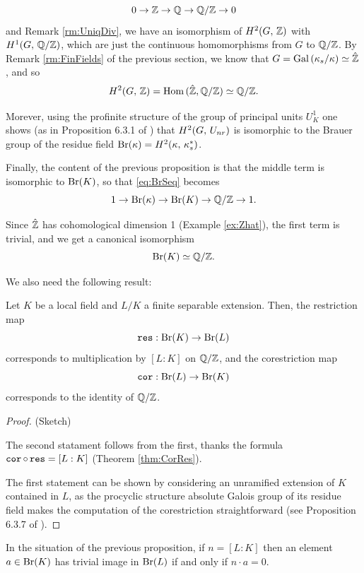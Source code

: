 \documentclass[a4paper, oneside]{memoir}
\begin{document}
\[
    0\to\mathbb{Z}\to\mathbb{Q}\to\mathbb{Q}/\mathbb{Z}\to 0
\]
and Remark \ref{rm:UniqDiv}, we have an isomorphism of $H^{2}( G, \, \mathbb{Z} )$ with $H^{1}( G, \, \mathbb{Q}/\mathbb{Z} )$, which are just the continuous homomorphisms from $G$ to $\mathbb{Q}/\mathbb{Z}$. By Remark
\ref{rm:FinFields} of the previous
section, we know that $G=\operatorname{Gal}{(\kappa_{s}/\kappa)}\simeq\hat{\mathbb{Z}}$, and so
\[
    H^{2}( G, \, \mathbb{Z} )=\operatorname{Hom}{(\hat{\mathbb{Z}},\mathbb{Q}/\mathbb{Z})}\simeq\mathbb{Q}/\mathbb{Z}.
\]

Morever, using the profinite structure of the group of principal units $U_K^1$ one shows (as in Proposition 6.3.1 of \cite{SzamuelyGille}) that $H^{2}( G, \, U_{nr} )$ is isomorphic to
the Brauer group of the residue field $\mathrm{Br}(\kappa)=H^{2}( \kappa, \, \kappa_{s}^* )$.

Finally, the content of the previous proposition is that the middle term is isomorphic to $\mathrm{Br}(K)$, so that \eqref{eq:BrSeq} becomes
\[
    1\to\mathrm{Br}(\kappa)\to\mathrm{Br}(K)\to\mathbb{Q}/\mathbb{Z}\to 1.
\]

Since $\hat{\mathbb{Z}}$ has cohomological dimension 1 (Example \ref{ex:Zhat}), the first term is trivial, and we get a canonical isomorphism
\begin{equation}\label{eq:BrK}
    \mathrm{Br}(K)\simeq\mathbb{Q}/\mathbb{Z}.
\end{equation}

We also need the following result:

\begin{proposition}\label{prop:BrCorRes}
    Let $K$ be a local field and $L/K$ a finite separable extension. Then, the restriction map
    \[
        \operatorname{\mathtt{res}}: \mathrm{Br}(K)\to\mathrm{Br}(L)
    \]
    corresponds to multiplication by $[L:K]$ on $\mathbb{Q}/\mathbb{Z}$,
    and the corestriction map
    \[
        \operatorname{\mathtt{cor}}: \mathrm{Br}(L)\to\mathrm{Br}(K)
    \]
    corresponds to the identity of $\mathbb{Q}/\mathbb{Z}$.
\end{proposition}

\begin{proof}{(Sketch)}

The second statament follows from the first, thanks the formula $\operatorname{\mathtt{cor}} \circ \operatorname{\mathtt{res}} = [L:K]$ (Theorem \ref{thm:CorRes}).

The first statement can be shown by considering an unramified extension of $K$ contained in $L$, as the procyclic structure absolute Galois group of its residue field makes the computation of the corestriction
straightforward (see Proposition 6.3.7 of \cite{SzamuelyGille}).
\end{proof}

\begin{corollary}\label{cor:BrRes}
    In the situation of the previous proposition, if $n=[L:K]$ then an element $a\in\mathrm{Br}(K)$ has trivial image in $\mathrm{Br}(L)$ if and only if $n\cdot a=0$.
\end{corollary}
\end{document}
